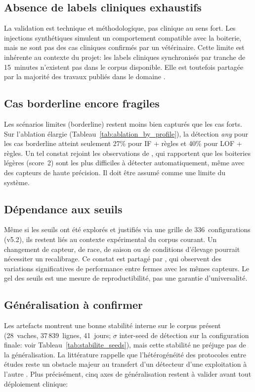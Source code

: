 \subsection{Absence de labels cliniques exhaustifs}
La validation est technique et méthodologique, pas clinique au sens fort. Les injections
synthétiques simulent un comportement compatible avec la boiterie, mais ne sont pas des cas
cliniques confirmés par un vétérinaire. Cette limite est inhérente au contexte du projet:
les labels cliniques synchronisés par tranche de 15~minutes n'existent pas dans le corpus
disponible. Elle est toutefois partagée par la majorité des travaux publiés dans le domaine
\citep{oleary2020accelerometers,qiao2021review}.

\subsection{Cas borderline encore fragiles}
Les scénarios limites (borderline) restent moins bien capturés que les cas forts.
Sur l'ablation élargie (Tableau~\ref{tab:ablation_by_profile}), la détection \textit{any}
pour les cas borderline atteint seulement 27\% pour IF + règles et 40\% pour LOF + règles.
Un tel constat rejoint les observations de \cite{chapinal2010measurement}, qui
rapportent que les boiteries légères (score~2) sont les plus difficiles à détecter
automatiquement, même avec des capteurs de haute précision. Il doit être assumé comme une
limite du système.

\subsection{Dépendance aux seuils}
Même si les seuils ont été explorés et justifiés via une grille de 336~configurations
(v5.2), ils restent liés au contexte expérimental du corpus courant. Un changement de
capteur, de race, de saison ou de conditions d'élevage pourrait nécessiter un
recalibrage. Ce constat est partagé par \cite{thorup2015lameness}, qui observent des
variations significatives de performance entre fermes avec les mêmes capteurs. Le gel des
seuils est une mesure de reproductibilité, pas une garantie d'universalité.

\subsection{Généralisation à confirmer}
\label{subsec:generalisation}

Les artefacts montrent une bonne stabilité interne sur le corpus présent
(28~vaches, 37\,839~lignes, 41~jours; $\sigma$ inter-seed de détection
sur la configuration finale: voir Tableau~\ref{tab:stabilite_seeds}),
mais cette stabilité ne préjuge pas de la généralisation. La littérature
rappelle que l'hétérogénéité des protocoles entre études reste un
obstacle majeur au transfert d'un détecteur d'une exploitation à l'autre
\citep{alsaaod2019automatic,oleary2020accelerometers}. Plus précisément,
cinq axes de généralisation restent à valider avant tout déploiement
clinique:

